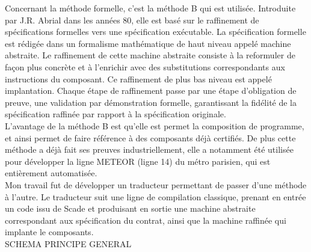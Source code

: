 Concernant la méthode formelle, c'est la méthode B qui est utilisée. Introduite
par J.R. Abrial dans les années 80, elle est basé sur le raffinement de
spécifications formelles vers une spécification exécutable. La spécification
formelle est rédigée dans un formalisme mathématique de haut niveau appelé
machine abstraite. Le raffinement de cette machine abstraite consiste à la
reformuler de façon plus concrète et à l'enrichir avec des substitutions
correspondants aux instructions du composant. Ce raffinement de plus bas niveau
est appelé implantation. Chaque étape de raffinement passe par une étape
d'obligation de preuve, une validation par démonstration formelle, garantissant
la fidélité de la spécification raffinée par rapport à la spécification
originale. \\
L'avantage de la méthode B est qu'elle est permet la composition de programme,
et ainsi permet de faire référence à des composants déjà certifiés. De plus
cette méthode a déjà fait ses preuves industriellement, elle a notamment été
utilisée pour développer la ligne METEOR (ligne 14) du métro parisien, qui est
entièrement automatisée.\\

Mon travail fut de développer un traducteur permettant de passer d'une méthode à
l'autre. Le traducteur suit une ligne de compilation classique, prenant en
entrée un code issu de Scade et produisant en sortie une machine abstraite
correspondant aux spécification du contrat, ainsi que la machine raffinée qui
implante le composants. \\

SCHEMA PRINCIPE GENERAL
